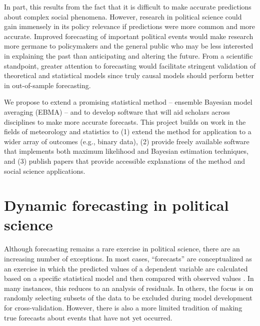 \documentclass[pdftex,12pt,fullpage,oneside]{amsart}
\begin{document}
In part, this results from the fact that it is difficult to make
accurate predictions about complex social phenomena. However, research
in political science could gain immensely in its policy relevance if
predictions were more common and more accurate.  Improved forecasting
of important political events would make research more germane to
policymakers and the general public who may be less interested in
explaining the past than anticipating and altering the future.  From a
scientific standpoint, greater attention to forecasting would
facilitate stringent validation of theoretical and statistical models
since truly causal models should perform better in out-of-sample
forecasting.

We propose to extend a promising statistical method -- ensemble
Bayesian model averaging (EBMA) -- and to develop software that will
aid scholars across disciplines to make more accurate forecasts.
This project builds on work in the fields of meteorology and
statistics to (1) extend the method for application to a wider array
of outcomes (e.g., binary data), (2) provide freely available software
that implements both maximum likelihood and Bayesian estimation
techniques, and (3) publish papers that provide accessible
explanations of the method and social science applications.


\section{Dynamic forecasting in political science}

Although forecasting remains a rare exercise in political science, there
are an increasing number of exceptions.  In most cases, ``forecasts''
are conceptualized as an exercise in which the predicted values of a
dependent variable are calculated based on a specific statistical
model and then compared with observed values
\citep[e.g.,][]{Hildebrand:etal:1976}. In many instances, this reduces
to an analysis of residuals.  In others, the focus is on randomly
selecting subsets of the data to be excluded during model development
for cross-validation.  However, there is also a more limited tradition
of making true forecasts about events that have not yet occurred.
\end{document}
